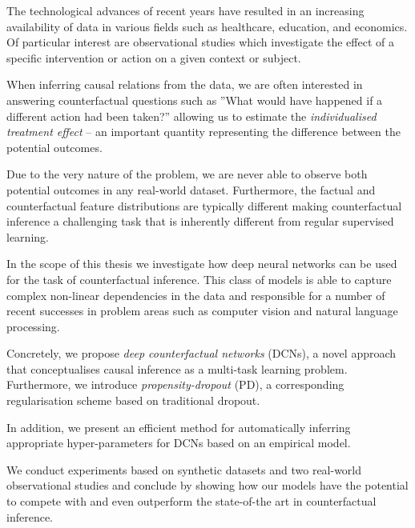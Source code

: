 The technological advances of recent years have resulted in an increasing availability of data in various fields such as healthcare, education, and economics. Of particular interest are observational studies which investigate the effect of a specific intervention or action on a given context or subject. 

When inferring causal relations from the data, we are often interested in answering counterfactual questions such as ”What would have happened if a different action had been taken?” allowing us to estimate the \emph{individualised treatment effect} -- an important quantity representing the difference between the potential outcomes.

Due to the very nature of the problem, we are never able to observe both potential outcomes in any real-world dataset. Furthermore, the factual and counterfactual feature distributions are typically different making counterfactual inference a challenging task that is inherently different from regular supervised learning. 

In the scope of this thesis we investigate how deep neural networks can be used for the task of counterfactual inference. This class of models is able to capture complex non-linear dependencies in the data and responsible for a number of recent successes in problem areas such as computer vision and natural language processing. 

Concretely, we propose \emph{deep counterfactual networks} (DCNs), a novel approach that conceptualises causal inference as a multi-task learning problem. Furthermore, we introduce \emph{propensity-dropout} (PD), a corresponding regularisation scheme based on traditional dropout.

In addition, we present an efficient method for automatically inferring appropriate hyper-parameters for DCNs based on an empirical model.

We conduct experiments based on synthetic datasets and two real-world observational studies and conclude by showing how our models have the potential to compete with and even outperform the state-of-the art in counterfactual inference. 


